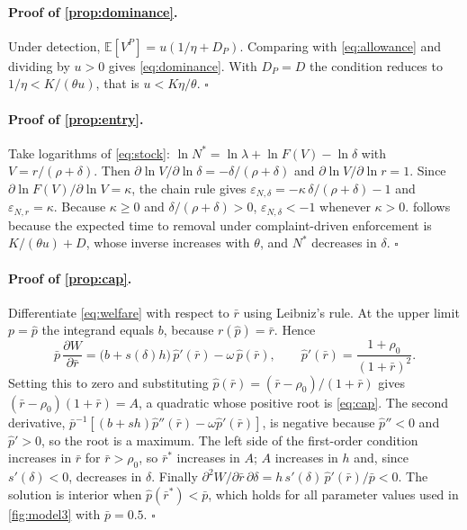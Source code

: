 \documentclass[11pt]{article}
\theoremstyle{plain}
\theoremstyle{definition}
\theoremstyle{remark}
\newcommand{\E}{\mathbb{E}}
\newcommand{\rbar}{\bar{r}}
\begin{document}
\paragraph{Proof of \cref{prop:dominance}.} Under detection, $\E[V^P] = u(1/\eta + D_P)$. Comparing with \eqref{eq:allowance} and dividing by $u>0$ gives \eqref{eq:dominance}. With $D_P = D$ the condition reduces to $1/\eta < K/(\theta u)$, that is $u < K\eta/\theta$. \hfill$\square$

\paragraph{Proof of \cref{prop:entry}.} Take logarithms of \eqref{eq:stock}: $\ln N^* = \ln\lambda + \ln F(V) - \ln\delta$ with $V = r/(\rho+\delta)$. Then $\partial\ln V/\partial\ln\delta = -\delta/(\rho+\delta)$ and $\partial\ln V/\partial\ln r = 1$. Since $\partial\ln F(V)/\partial\ln V = \kappa$, the chain rule gives $\varepsilon_{N,\delta} = -\kappa\,\delta/(\rho+\delta) - 1$ and $\varepsilon_{N,r} = \kappa$. Because $\kappa \geq 0$ and $\delta/(\rho+\delta) > 0$, $\varepsilon_{N,\delta} < -1$ whenever $\kappa > 0$.  follows because the expected time to removal under complaint-driven enforcement is $K/(\theta u) + D$, whose inverse increases with $\theta$, and $N^*$ decreases in $\delta$. \hfill$\square$

\paragraph{Proof of \cref{prop:cap}.} Differentiate \eqref{eq:welfare} with respect to $\rbar$ using Leibniz's rule. At the upper limit $p = \hat p$ the integrand equals $b$, because $r(\hat p) = \rbar$. Hence
\[
\bar p\,\frac{\partial W}{\partial\rbar} = \big(b + s(\delta)h\big)\,\hat p'(\rbar) - \omega\,\hat p(\rbar),
\qquad \hat p'(\rbar) = \frac{1+\rho_0}{(1+\rbar)^2}.
\]
Setting this to zero and substituting $\hat p(\rbar) = (\rbar-\rho_0)/(1+\rbar)$ gives $(\rbar-\rho_0)(1+\rbar) = A$, a quadratic whose positive root is \eqref{eq:cap}. The second derivative, $\bar p^{-1}[(b+sh)\hat p''(\rbar) - \omega\hat p'(\rbar)]$, is negative because $\hat p'' < 0$ and $\hat p' > 0$, so the root is a maximum. The left side of the first-order condition increases in $\rbar$ for $\rbar > \rho_0$, so $\rbar^*$ increases in $A$; $A$ increases in $h$ and, since $s'(\delta) < 0$, decreases in $\delta$. Finally $\partial^2 W/\partial\rbar\,\partial\delta = h\,s'(\delta)\,\hat p'(\rbar)/\bar p < 0$. The solution is interior when $\hat p(\rbar^*) < \bar p$, which holds for all parameter values used in \cref{fig:model3} with $\bar p = 0.5$. \hfill$\square$
\end{document}
